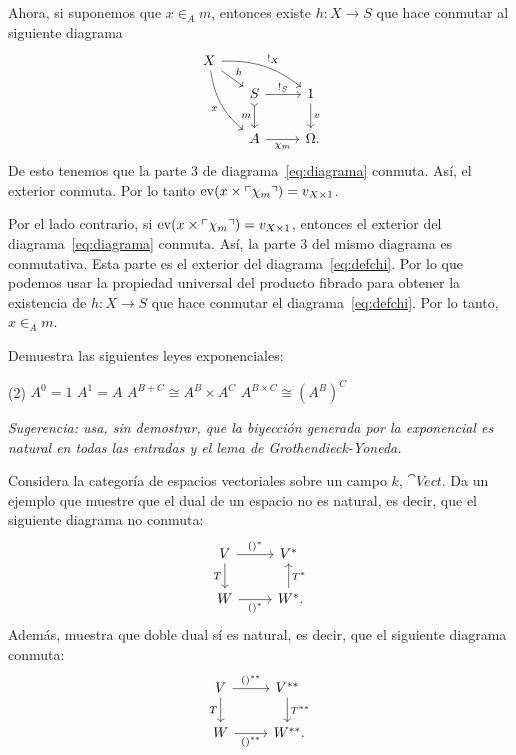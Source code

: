 \begin{solution}[print=true]
  Ahora, si suponemos que \(x\in_A m\), entonces existe \(h\colon X\to S\) que
  hace conmutar al siguiente diagrama
  \begin{equation}\label{eq:defchi}
    \begin{tikzcd}[ampersand replacement=\&]
      X\ar[bend left=20]{rrd}{!_X}\ar[bend right=20]{ddr}[swap]{x}
        \ar{rd}{h}\\[-2ex]
      \&[-2ex] S\ar{r}{!_S}\ar[tail]{d}[swap]{m} \& 1\ar{d}{v}\\
      \& A\ar{r}[swap]{\chi_m} \& \Omega\mathrlap{.}
    \end{tikzcd}
  \end{equation}
  De esto tenemos que la parte 3 de diagrama~\eqref{eq:diagrama} conmuta. Así, el
  exterior conmuta. Por lo tanto \(\mathrm{ev}(x\times\ulcorner\chi_m\urcorner)=v_{X\times 1}\).
  
  Por el lado contrario, si \(\mathrm{ev}(x\times\ulcorner\chi_m\urcorner)=v_{X\times 1}\),
  entonces el exterior del diagrama~\eqref{eq:diagrama} conmuta. Así, la parte 3
  del mismo diagrama es conmutativa. Esta parte es el exterior del
  diagrama~\eqref{eq:defchi}. Por lo que podemos usar la propiedad universal del
  producto fibrado para obtener la existencia de \(h\colon X\to S\) que hace
  conmutar el diagrama~\eqref{eq:defchi}. Por lo tanto, \(x\in_A m\). 
\end{solution}

\begin{exercise}[par=2]
  Demuestra las siguientes leyes exponenciales:
  \begin{tasks}(2)
    \task \(A^0=1\)
    \task \(A^1=A\)
    \task \(A^{B+C}\cong A^B\times A^C\)
    \task \(A^{B\times C}\cong (A^B)^C\)
  \end{tasks}
  \textit{Sugerencia: usa, sin demostrar, que la biyección generada por la exponencial es natural en todas las entradas y el lema de Grothendieck-Yoneda.}
\end{exercise}

\begin{exercise}[par=2]
  Considera la categoría de espacios vectoriales sobre un campo \(k\),
  \(\cat{Vect}\). Da un ejemplo que muestre que el dual de un espacio no es
  natural, es decir, que el siguiente diagrama no conmuta:
  \begin{equation*}
    \begin{tikzcd}[ampersand replacement=\&]
      V\ar{r}{()^*}\ar{d}[swap]{T} \& V^*\\
      W\ar{r}[swap]{()^*} \& W^*\mathrlap{.}\ar{u}[swap]{T^*}     
    \end{tikzcd}
  \end{equation*}
  Además, muestra que doble dual sí es natural, es decir, que el
  siguiente diagrama conmuta:
  \begin{equation*}
    \begin{tikzcd}[ampersand replacement=\&]
      V\ar{r}{()^{**}}\ar{d}[swap]{T} \& V^{**}\ar{d}{T^{**}}\\
      W\ar{r}[swap]{()^{**}} \& W^{**}\mathrlap{.}
    \end{tikzcd}
  \end{equation*}
\end{exercise}

